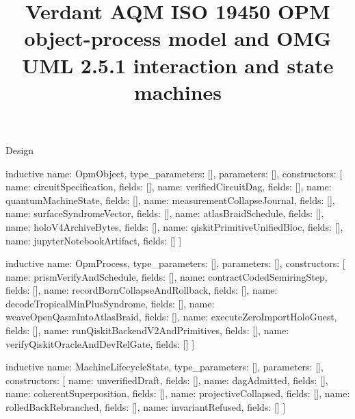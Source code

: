 \begin{lexlean}{Design}
\title{Verdant AQM ISO 19450 OPM object-process model and OMG UML 2.5.1 interaction and state machines}

\begin{semanticmodule}

inductive{
  name: OpmObject,
  type_parameters: [],
  parameters: [],
  constructors: [
    {name: circuitSpecification, fields: []},
    {name: verifiedCircuitDag, fields: []},
    {name: quantumMachineState, fields: []},
    {name: measurementCollapseJournal, fields: []},
    {name: surfaceSyndromeVector, fields: []},
    {name: atlasBraidSchedule, fields: []},
    {name: holoV4ArchiveBytes, fields: []},
    {name: qiskitPrimitiveUnifiedBloc, fields: []},
    {name: jupyterNotebookArtifact, fields: []}
  ]
}

inductive{
  name: OpmProcess,
  type_parameters: [],
  parameters: [],
  constructors: [
    {name: prismVerifyAndSchedule, fields: []},
    {name: contractCodedSemiringStep, fields: []},
    {name: recordBornCollapseAndRollback, fields: []},
    {name: decodeTropicalMinPlusSyndrome, fields: []},
    {name: weaveOpenQasmIntoAtlasBraid, fields: []},
    {name: executeZeroImportHoloGuest, fields: []},
    {name: runQiskitBackendV2AndPrimitives, fields: []},
    {name: verifyQiskitOracleAndDevRelGate, fields: []}
  ]
}

inductive{
  name: MachineLifecycleState,
  type_parameters: [],
  parameters: [],
  constructors: [
    {name: unverifiedDraft, fields: []},
    {name: dagAdmitted, fields: []},
    {name: coherentSuperposition, fields: []},
    {name: projectiveCollapsed, fields: []},
    {name: rolledBackRebranched, fields: []},
    {name: invariantRefused, fields: []}
  ]
}


\end{semanticmodule}
\end{lexlean}
